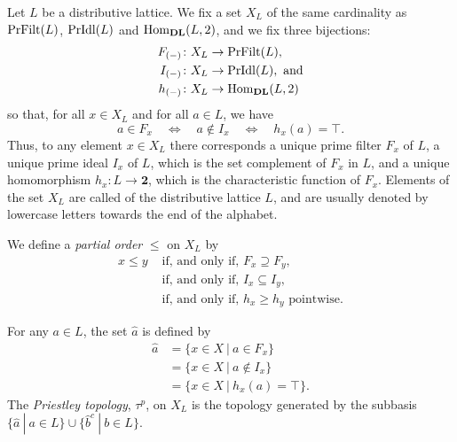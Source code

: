 \begin{notationnum}\label{not:neutral}
Let $L$ be a distributive lattice. We fix a set $X_L$ of the same cardinality as $\mathrm{PrFilt}(L)$, $\mathrm{PrIdl}(L)$ and $\mathrm{Hom}_{\mathbf{DL}}(L,2)$, and we fix three bijections:
\begin{align*}
F_{(-)} &\colon X_L \to \mathrm{PrFilt}(L),  \\
I_{(-)} &\colon X_L \to \mathrm{PrIdl}(L), \text{ and} \\
h_{(-)} &\colon X_L \to \mathrm{Hom}_{\mathbf{DL}}(L,2)
\end{align*}
so that, for all $x\in X_L$ and for all $a\in L$, we have
\[
a\in F_x \quad\iff\quad a\not\in I_x \quad\iff\quad h_x(a)=\top.
\]
Thus, to any element $x \in X_L$ there corresponds a unique prime filter $F_x$ of $L$, a unique prime ideal $I_x$ of $L$, which is the set complement of $F_x$ in $L$, and a unique homomorphism $h_x \colon L \to \mathbf{2}$, which is the characteristic function of $F_x$. Elements of the set $X_L$ are called  of the distributive lattice $L$, and are usually denoted by lowercase letters towards the end of the alphabet.

We define a \emph{partial order} $\leq$ on $X_L$  by
\begin{align*}
x \leq y &\text{ if, and only if, } F_x \supseteq F_y, \\
		&\text{ if, and only if, } I_x \subseteq I_y, \\
		&\text{ if, and only if, } h_x \geq h_y \text{ pointwise}.
\end{align*}

For any $a \in L$, the set $\widehat{a}$ is defined by
\begin{align*}
\widehat{a} &= \{ x \in X \ | \ a \in F_x \} \\
			&= \{ x \in X \ | \ a \not\in I_x \} \\
			&= \{ x \in X \ | \ h_x(a) = \top\}.
\end{align*}
The \emph{Priestley topology}, $\tau^p$, on $X_L$ is the topology generated by the subbasis $\{\widehat{a} \ | \ a \in L\} \cup \{\widehat{b}^c \ | \ b \in L\}$.
\end{notationnum}

